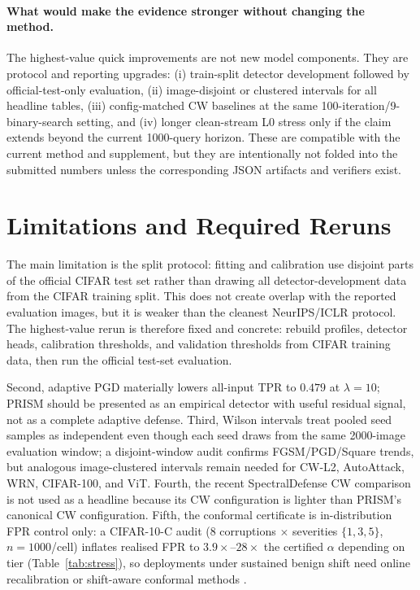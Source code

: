 \documentclass{article}
\newcommand{\prism}{\textsc{PRISM}\xspace}
\begin{document}
\paragraph{What would make the evidence stronger without changing the method.}
The highest-value quick improvements are not new model components. They are protocol and reporting upgrades: (i) train-split detector development followed by official-test-only evaluation, (ii) image-disjoint or clustered intervals for all headline tables, (iii) config-matched CW baselines at the same 100-iteration/9-binary-search setting, and (iv) longer clean-stream L0 stress only if the claim extends beyond the current 1000-query horizon. These are compatible with the current method and supplement, but they are intentionally not folded into the submitted numbers unless the corresponding JSON artifacts and verifiers exist.

\section{Limitations and Required Reruns}
\label{sec:limitations}
The main limitation is the split protocol: fitting and calibration use disjoint parts of the official CIFAR test set rather than drawing all detector-development data from the CIFAR training split. This does not create overlap with the reported evaluation images, but it is weaker than the cleanest NeurIPS/ICLR protocol. The highest-value rerun is therefore fixed and concrete: rebuild profiles, detector heads, calibration thresholds, and validation thresholds from CIFAR training data, then run the official test-set evaluation.

Second, adaptive PGD materially lowers all-input TPR to $0.479$ at $\lambda=10$; \prism should be presented as an empirical detector with useful residual signal, not as a complete adaptive defense. Third, Wilson intervals treat pooled seed samples as independent even though each seed draws from the same 2000-image evaluation window; a disjoint-window audit confirms FGSM/PGD/Square trends, but analogous image-clustered intervals remain needed for CW-L2, AutoAttack, WRN, CIFAR-100, and ViT. Fourth, the recent SpectralDefense CW comparison is not used as a headline because its CW configuration is lighter than \prism's canonical CW configuration. Fifth, the conformal certificate is in-distribution FPR control only: a CIFAR-10-C audit (8 corruptions $\times$ severities $\{1,3,5\}$, $n{=}1000$/cell) inflates realised FPR to $3.9\times$--$28\times$ the certified $\alpha$ depending on tier (Table~\ref{tab:stress}), so deployments under sustained benign shift need online recalibration or shift-aware conformal methods \cite{tibshirani2019conformal}.
\end{document}
